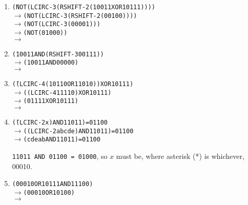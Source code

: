 \documentclass[12pt,letterpaper]{article}
\begin{document}
\begin{enumerate}

\item \begin{alltt}
  \begin{tabbing}
    \hphantom{\(\rightarrow\)}\= (NOT (LCIRC-3 (RSHIFT-2 (10011 XOR 10111)))) \\
    \(\rightarrow\)\> (NOT (LCIRC-3 (RSHIFT-2 (00100)))) \\
    \(\rightarrow\)\> (NOT (LCIRC-3 (00001))) \\
    \(\rightarrow\)\> (NOT (01000)) \\
    \(\rightarrow\)
  \end{tabbing}
\end{alltt}

\item \begin{alltt}
  \begin{tabbing}
    \hphantom{\(\rightarrow\)}\= (10011 AND (RSHIFT-3 00111)) \\
    \(\rightarrow\)\> (10011 AND 00000) \\
    \(\rightarrow\)
  \end{tabbing}
\end{alltt}

\item \begin{alltt}
  \begin{tabbing}
    \hphantom{\(\rightarrow\)}\= ((LCIRC-4 (10110 OR 11010)) XOR 10111) \\
    \(\rightarrow\)\> ((LCIRC-4 11110) XOR 10111) \\
    \(\rightarrow\)\> (01111 XOR 10111) \\
    \(\rightarrow\)
  \end{tabbing}
\end{alltt}

\item \begin{alltt}
  \begin{tabbing}
    \hphantom{\(\rightarrow\)}\= ((LCIRC-2 x) AND 11011) = 01100 \\
    \(\rightarrow\)\> ((LCIRC-2 abcde) AND 11011) = 01100 \\
    \(\rightarrow\)\> (cdeab AND 11011) = 01100
  \end{tabbing}
\end{alltt}

  \texttt{11011 AND 01100 = 01000}, so $x$ must be, where asterisk (*) is whichever, 00010.

\item \begin{alltt}
  \begin{tabbing}
    \hphantom{\(\rightarrow\)}\= (00010 OR 10111 AND 11100) \\
    \(\rightarrow\)\> (00010 OR 10100) \\
    \(\rightarrow\)
  \end{tabbing}
\end{alltt}

\end{enumerate}
\end{document}
